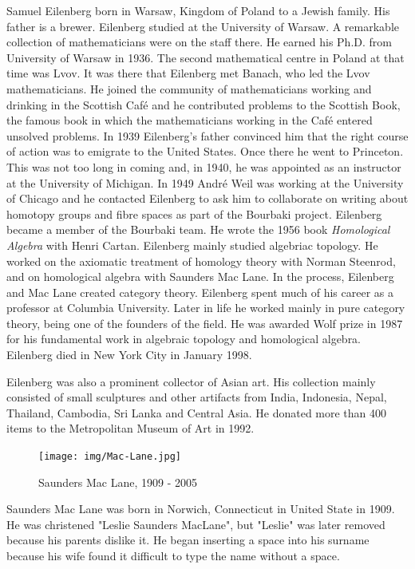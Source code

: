\documentclass[b5paper]{article}
\begin{document}
Samuel Eilenberg born in Warsaw, Kingdom of Poland to a Jewish family. His father is a brewer. Eilenberg studied at the University of Warsaw. A remarkable collection of mathematicians were on the staff there. He earned his Ph.D. from University of Warsaw in 1936. The second mathematical centre in Poland at that time was Lvov. It was there that Eilenberg met Banach, who led the Lvov mathematicians. He joined the community of mathematicians working and drinking in the Scottish Café and he contributed problems to the Scottish Book, the famous book in which the mathematicians working in the Café entered unsolved problems. In 1939 Eilenberg's father convinced him that the right course of action was to emigrate to the United States. Once there he went to Princeton. This was not too long in coming and, in 1940, he was appointed as an instructor at the University of Michigan. In 1949 André Weil was working at the University of Chicago and he contacted Eilenberg to ask him to collaborate on writing about homotopy groups and fibre spaces as part of the Bourbaki project. Eilenberg became a member of the Bourbaki team. He wrote the 1956 book {\em Homological Algebra} with Henri Cartan. Eilenberg mainly studied algebriac topology. He worked on the axiomatic treatment of homology theory with Norman Steenrod, and on homological algebra with Saunders Mac Lane. In the process, Eilenberg and Mac Lane created category theory. Eilenberg spent much of his career as a professor at Columbia University. Later in life he worked mainly in pure category theory, being one of the founders of the field. He was awarded Wolf prize in 1987 for his fundamental work in algebraic topology and homological algebra. Eilenberg died in New York City in January 1998.

Eilenberg was also a prominent collector of Asian art. His collection mainly consisted of small sculptures and other artifacts from India, Indonesia, Nepal, Thailand, Cambodia, Sri Lanka and Central Asia. He donated more than 400 items to the Metropolitan Museum of Art in 1992\cite{Wiki-Eilenberg}.

\vspace{5mm}

\begin{figure}
 \centering
 \texttt{[image: img/Mac-Lane.jpg]}
 \captionsetup{labelformat=empty}
 \caption{Saunders Mac Lane, 1909 - 2005}
 \label{fig:Mac-Lane}
\end{figure}

Saunders Mac Lane was born in Norwich, Connecticut in United State in 1909. He was christened "Leslie Saunders MacLane", but "Leslie" was later removed because his parents dislike it. He began inserting a space into his surname because his wife found it difficult to type the name without a space.
\end{document}
